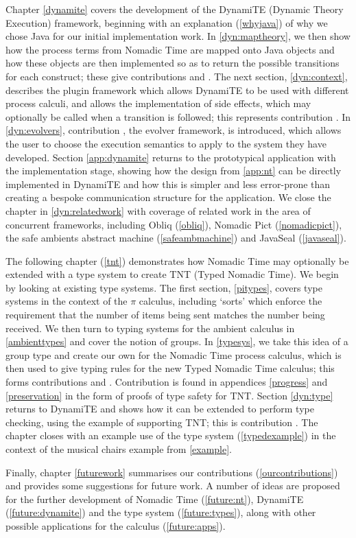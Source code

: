 Chapter \ref{dynamite} covers the development of the DynamiTE (Dynamic
Theory Execution) framework, beginning with an explanation
(\ref{whyjava}) of why we chose Java for our initial implementation
work.  In \ref{dyn:maptheory}, we then show how the process terms from
Nomadic Time are mapped onto Java objects and how these objects are
then implemented so as to return the possible transitions for each
construct; these give contributions  and .  The
next section, \ref{dyn:context}, describes the plugin framework which
allows DynamiTE to be used with different process calculi, and allows
the implementation of side effects, which may optionally be called
when a transition is followed; this represents contribution
.  In \ref{dyn:evolvers}, contribution , the
evolver framework, is introduced, which allows the user to choose the
execution semantics to apply to the system they have developed.
Section \ref{app:dynamite} returns to the prototypical application
with the implementation stage, showing how the design from
\ref{app:nt} can be directly implemented in DynamiTE and how this is
simpler and less error-prone than creating a bespoke communication
structure for the application.  We close the chapter in
\ref{dyn:relatedwork} with coverage of related work in the area of
concurrent frameworks, including Obliq \cite{obliq} (\ref{obliq}),
Nomadic Pict \cite{wojciechowski:phd} (\ref{nomadicpict}), the safe
ambients abstract machine \cite{sangiorgi:safeambientsmachine}
(\ref{safeambmachine}) and JavaSeal \cite{javaseal} (\ref{javaseal}).

The following chapter (\ref{tnt}) demonstrates how Nomadic Time may
optionally be extended with a type system to create TNT (Typed Nomadic
Time).  We begin by looking at existing type systems. The first
section, \ref{pitypes}, covers type systems in the context of the
$\pi$ calculus, including `sorts' which enforce the requirement that
the number of items being sent matches the number being received.  We
then turn to typing systems for the ambient calculus in
\ref{ambienttypes} and cover the notion of groups.  In \ref{typesys},
we take this idea of a group type and create our own for the Nomadic
Time process calculus, which is then used to give typing rules for the
new Typed Nomadic Time calculus; this forms contributions 
and .  Contribution  is found in appendices
\ref{progress} and \ref{preservation} in the form of proofs of type
safety for TNT.  Section \ref{dyn:type} returns to DynamiTE and shows
how it can be extended to perform type checking, using the example of
supporting TNT; this is contribution .  The chapter closes
with an example use of the type system (\ref{typedexample}) in the
context of the musical chairs example from \ref{example}.

Finally, chapter \ref{futurework} summarises our contributions
(\ref{ourcontributions}) and provides some suggestions for future
work.  A number of ideas are proposed for the further development of
Nomadic Time (\ref{future:nt}), DynamiTE (\ref{future:dynamite}) and
the type system (\ref{future:types}), along with other possible
applications for the calculus (\ref{future:apps}).

